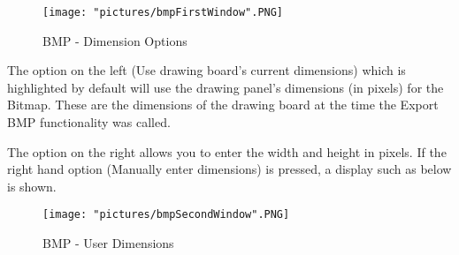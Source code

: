 \documentclass[12pt]{article} %
\begin{document}
\begin{figure}[hbtp]
\caption{BMP - Dimension Options}
\centering
\texttt{[image: "pictures/bmpFirstWindow".PNG]}
\end{figure}

The option on the left (Use drawing board's current dimensions) which is highlighted by default will use the drawing panel's dimensions (in pixels) for the Bitmap. These are the dimensions of the drawing board at the time the Export BMP functionality was called.

The option on the right allows you to enter the width and height in pixels. If the right hand option (Manually enter dimensions) is pressed, a display such as below is shown.

\begin{figure}[hbtp]
\caption{BMP - User Dimensions}
\centering
\texttt{[image: "pictures/bmpSecondWindow".PNG]}
\end{figure} 
\end{document}
